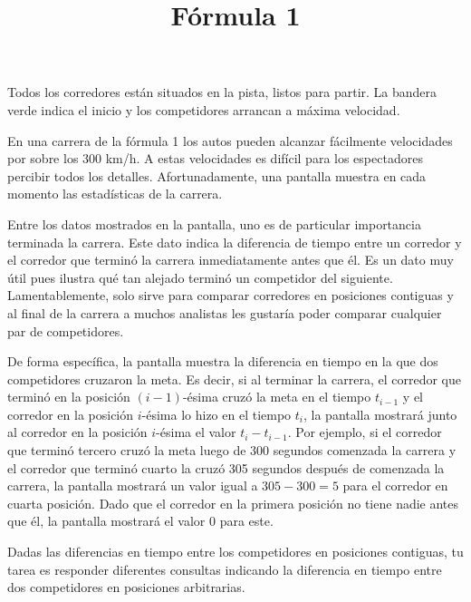 \documentclass{oci}
\title{Fórmula 1}
\begin{document}
\begin{problemDescription}
  Todos los corredores están situados en la pista, listos para partir.
  La bandera verde indica el inicio y los competidores arrancan a máxima velocidad.

  En una carrera de la fórmula 1 los autos pueden alcanzar fácilmente velocidades por sobre los 300 km/h.
  A estas velocidades es difícil para los espectadores percibir todos los detalles.
  Afortunadamente, una pantalla muestra en cada momento las estadísticas de la carrera.

  Entre los datos mostrados en la pantalla, uno es de particular importancia terminada la carrera.
  Este dato indica la diferencia de tiempo entre un corredor y el
  corredor que terminó la carrera inmediatamente antes que él.
  Es un dato muy útil pues ilustra qué tan alejado terminó un competidor del siguiente.
  Lamentablemente, solo sirve para comparar corredores en posiciones contiguas y al final
  de la carrera a muchos analistas les gustaría poder comparar cualquier par de competidores.

  De forma específica, la pantalla muestra la diferencia en tiempo en la que dos competidores
  cruzaron la meta.
  Es decir, si al terminar la carrera, el corredor que terminó en la posición $(i-1)$-ésima cruzó la
  meta en el tiempo $t_{i-1}$ y el corredor en la posición $i$-ésima lo hizo en el tiempo $t_{i}$,
  la pantalla mostrará junto al corredor en la posición $i$-ésima el valor $t_{i} - t_{i-1}$.
  Por ejemplo, si el corredor que terminó tercero cruzó la meta luego de 300 segundos
  comenzada la carrera y el corredor que terminó cuarto la cruzó 305 segundos después de comenzada la
  carrera, la pantalla mostrará un valor igual a $305-300=5$ para el corredor en cuarta posición.
  Dado que el corredor en la primera posición no tiene nadie antes que él, la pantalla mostrará
  el valor 0 para este.

  Dadas las diferencias en tiempo entre los competidores en posiciones contiguas, tu tarea es
  responder diferentes consultas indicando la diferencia en tiempo entre dos competidores en
  posiciones arbitrarias.
\end{problemDescription}
\end{document}
